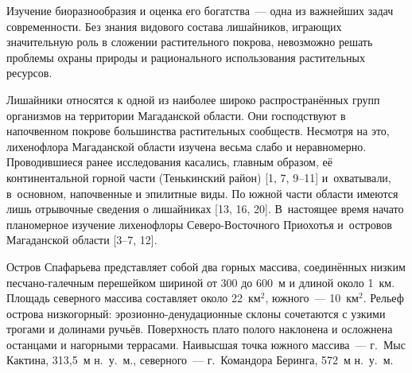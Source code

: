  

\makeProcTitle
{}

Изучение биоразнообразия и оценка его богатства~--- одна из важнейших задач современности. Без знания видового состава лишайников, играющих значительную роль в сложении растительного покрова, невозможно решать проблемы охраны природы и рационального использования растительных ресурсов.

Лишайники относятся к одной из наиболее широко распространённых групп организмов на территории Магаданской области. Они господствуют в напочвенном покрове большинства растительных сообществ. Несмотря на это, лихенофлора Магаданской области изучена весьма слабо и неравномерно. Проводившиеся ранее исследования касались, главным образом, её континентальной горной части (Тенькинский район) [1, 7, 9--11] и~охватывали, в~основном, напочвенные и эпилитные виды. По южной части области имеются лишь отрывочные сведения о лишайниках [13, 16, 20]. В~настоящее время начато планомерное изучение лихенофлоры Северо-Восточного Приохотья и~островов Магаданской области [3--7, 12].

Остров Спафарьева представляет собой два горных массива, соединённых низким пес\-ча\-но-галечным перешейком шириной от 300 до 600~м и длиной около 1~км. Площадь северного массива составляет около 22~км$^2$, южного~--- 10~км$^2$. Рельеф острова низкогорный: эрозионно-денудационные склоны сочетаются с узкими трогами и долинами ручьёв. Поверхность плато полого наклонена и осложнена останцами и нагорными террасами. Наивысшая точка южного массива~--- г.~Мыс Кактина, 313,5~м н.~у.~м., северного~--- г.~Командора Беринга, 572~м н.~у.~м.

